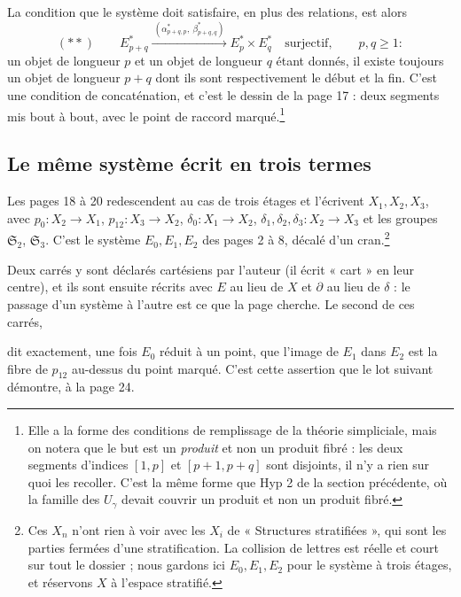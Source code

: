 \documentclass[11pt,a4paper]{article}
\begin{document}
La condition que le système doit satisfaire, en plus des relations, est alors
\[
  (**) \qquad
  E^{*}_{p+q} \xrightarrow{\ (\alpha^{*}_{p+q,p},\ \beta^{*}_{p+q,q})\ }
  E^{*}_{p} \times E^{*}_{q} \quad \text{surjectif}, \qquad p,q \geq 1 :
\]
un objet de longueur $p$ et un objet de longueur $q$ étant donnés, il existe
toujours un objet de longueur $p+q$ dont ils sont respectivement le début et la
fin. C'est une condition de concaténation, et c'est le dessin de la page 17 :
deux segments mis bout à bout, avec le point de raccord
marqué.\footnote{Elle a la forme des conditions de remplissage de la théorie
simpliciale, mais on notera que le but est un \emph{produit} et non un produit
fibré : les deux segments d'indices $[1,p]$ et $[p+1,p+q]$ sont disjoints, il
n'y a rien sur quoi les recoller. C'est la même forme que Hyp 2 de la section
précédente, où la famille des $U_{\gamma}$ devait couvrir un produit et non un
produit fibré.}

\subsection*{Le même système écrit en trois termes}

Les pages 18 à 20 redescendent au cas de trois étages et l'écrivent
$X_{1}, X_{2}, X_{3}$, avec $p_{0} \colon X_{2} \to X_{1}$,
$p_{12} \colon X_{3} \to X_{2}$, $\delta_{0} \colon X_{1} \to X_{2}$,
$\delta_{1},\delta_{2},\delta_{3} \colon X_{2} \to X_{3}$ et les groupes
$\mathfrak{S}_{2}$, $\mathfrak{S}_{3}$. C'est le système
$E_{0}, E_{1}, E_{2}$ des pages 2 à 8, décalé d'un
cran.\footnote{Ces $X_{n}$ n'ont rien à voir avec les $X_{i}$ de
« Structures stratifiées », qui sont les parties fermées d'une stratification.
La collision de lettres est réelle et court sur tout le dossier ; nous gardons
ici $E_{0}, E_{1}, E_{2}$ pour le système à trois étages, et réservons $X$ à
l'espace stratifié.}

Deux carrés y sont déclarés cartésiens par l'auteur (il écrit « cart » en leur
centre), et ils sont ensuite récrits avec $E$ au lieu de $X$ et $\partial$ au
lieu de $\delta$ : le passage d'un système à l'autre est ce que la page cherche.
Le second de ces carrés,

dit exactement, une fois $E_{0}$ réduit à un point, que l'image de $E_{1}$ dans
$E_{2}$ est la fibre de $p_{12}$ au-dessus du point marqué. C'est cette
assertion que le lot suivant démontre, à la page 24.
\end{document}
